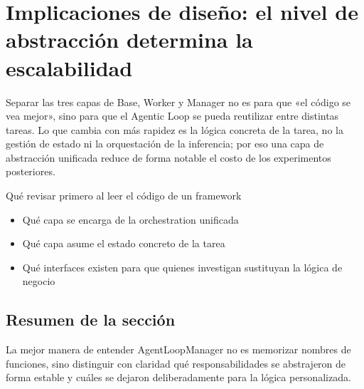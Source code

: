\section{Implicaciones de diseño: el nivel de abstracción determina la escalabilidad}
Separar las tres capas de Base, Worker y Manager no es para que «el código se vea mejor», sino para que el Agentic Loop se pueda reutilizar entre distintas tareas. Lo que cambia con más rapidez es la lógica concreta de la tarea, no la gestión de estado ni la orquestación de la inferencia; por eso una capa de abstracción unificada reduce de forma notable el costo de los experimentos posteriores.

\begin{knowledgebox}{Qué revisar primero al leer el código de un framework}
\begin{itemize}
  \item Qué capa se encarga de la orchestration unificada
  \item Qué capa asume el estado concreto de la tarea
  \item Qué interfaces existen para que quienes investigan sustituyan la lógica de negocio
\end{itemize}
\end{knowledgebox}

\subsection{Resumen de la sección}
La mejor manera de entender AgentLoopManager no es memorizar nombres de funciones, sino distinguir con claridad qué responsabilidades se abstrajeron de forma estable y cuáles se dejaron deliberadamente para la lógica personalizada.

\newpage
